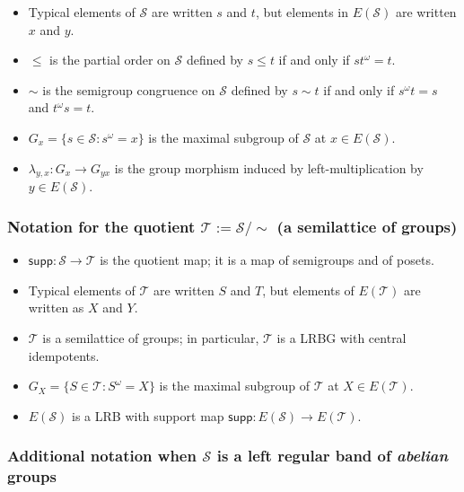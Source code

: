 \documentclass[11pt, oneside, reqno]{amsart}
\theoremstyle{definition}
\numberwithin{equation}{section}
\def \SS{{\mathcal{S}}}
\def \TT{{\mathcal{T}}}
\def \supp{\mathsf{supp}}
\begin{document}
\begin{itemize}[wide]
    \item
        Typical elements of $\SS$ are written $s$ and $t$,
        but elements in $E(\SS)$ are written $x$ and $y$.

    \item
        $\leq$ is the partial order on $\SS$ defined by $s \leq t$ if and only if $s t^\omega = t$.

    \item
        $\sim$ is the semigroup congruence on $\SS$ defined by $s \sim t$ if and only if $s^\omega t = s$ and $t^\omega s = t$.

    \item
        $G_{x} = \{ s \in \SS : s^\omega = x \}$ is the maximal subgroup of $\SS$ at $x \in E(\SS)$.

    \item
        $\lambda_{y, x}: G_{x} \to G_{yx}$ is the group morphism induced by left-multiplication by $y \in E(\SS)$.
\end{itemize}

\subsubsection*{Notation for the quotient $\TT := \SS/{\sim}$ (a semilattice of groups)}

\begin{itemize}[wide]
    \item
        $\supp: \SS \to \TT$ is the quotient map; it is a map of semigroups and of posets.

    \item
        Typical elements of $\TT$ are written $S$ and $T$, but
        elements of $E(\TT)$ are written as $X$ and $Y$.

    \item
        $\TT$ is a semilattice of groups; in particular, $\TT$ is a LRBG with central idempotents.

    \item
        $G_{X} = \{ S \in \TT : S^\omega = X \}$ is the maximal subgroup of $\TT$ at $X \in E(\TT)$.

    \item
        $E(\SS)$ is a LRB with support map $\supp: E(\SS) \to E(\TT)$.
\end{itemize}

\subsubsection*{Additional notation when $\SS$ is a left regular band of \emph{abelian} groups}
\end{document}

